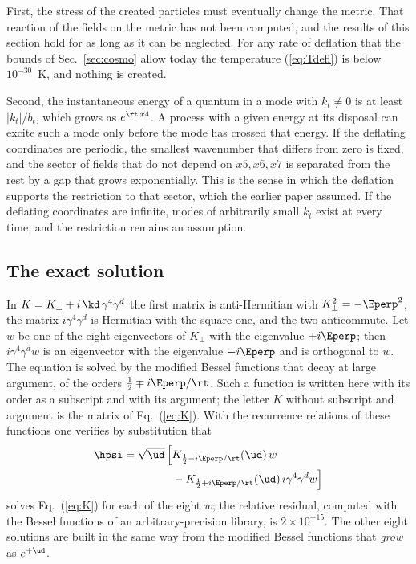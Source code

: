 First, the stress of the created particles must eventually change the metric. That reaction of the
fields on the metric has not been computed, and the results of this section hold for as long as it
can be neglected. For any rate of deflation that the bounds of Sec.~\ref{sec:cosmo} allow today the
temperature (\ref{eq:Tdefl}) is below $10^{-30}$~K, and nothing is created.

Second, the instantaneous energy of a quantum in a mode with $k_t\ne0$ is at least $|k_t|/b_t$,
which grows as $e^{\rt\,x4}$. A process with a given energy at its disposal can excite such a mode
only before the mode has crossed that energy. If the deflating coordinates are periodic, the
smallest wavenumber that differs from zero is fixed, and the sector of fields that do not depend on
$x5,x6,x7$ is separated from the rest by a gap that grows exponentially. This is the sense in which
the deflation supports the restriction to that sector, which the earlier paper assumed. If the
deflating coordinates are infinite, modes of arbitrarily small $k_t$ exist at every time, and the
restriction remains an assumption.
\subsection{The exact solution}

In $K=K_\perp+i\,\kd\,\gamma^{4}\gamma^{d}$ the first matrix is anti-Hermitian with
$K_\perp^{2}=-\Eperp^{2}$, the matrix $i\gamma^{4}\gamma^{d}$ is Hermitian with the square one, and
the two anticommute. Let $w$ be one of the eight eigenvectors of $K_\perp$ with the eigenvalue
$+i\Eperp$; then $i\gamma^{4}\gamma^{d}w$ is an eigenvector with the eigenvalue $-i\Eperp$ and is
orthogonal to $w$. The equation is solved by the modified Bessel functions that decay at large
argument, of the orders $\tfrac12\mp i\Eperp/\rt$. Such a function is written here with its order
as a subscript and with its argument; the letter $K$ without subscript and argument is the matrix of
Eq.~(\ref{eq:K}). With the recurrence relations of these functions one verifies by substitution that
\begin{equation}
\begin{aligned}
\hpsi=\sqrt{\ud}\,\Big[&K_{\frac12-i\Eperp/\rt}(\ud)\,w\\
&-K_{\frac12+i\Eperp/\rt}(\ud)\,i\gamma^{4}\gamma^{d}w\Big]
\end{aligned}
\label{eq:exact}
\end{equation}
solves Eq.~(\ref{eq:K}) for each of the eight $w$; the relative residual, computed with the Bessel
functions of an arbitrary-precision library, is $2\times10^{-15}$. The other eight solutions are built in
the same way from the modified Bessel functions that \emph{grow} as $e^{+\ud}$.

